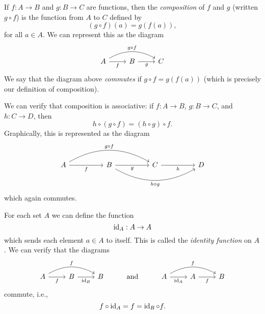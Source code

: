 \begin{sectionthm}
    If \(f: A \to B\) and \(g: B \to C\) are functions, then the \emph{composition} of \(f\) and \(g\) (written \(g \circ f\)) is the function from \(A\) to \(C\) defined by
    \[
        (g \circ f)(a) = g(f(a)),
    \]
    for all \(a \in A\). We can represent this as the diagram
    \[
        \begin{tikzcd}
            A \arrow[r, "f"'] \arrow[rr, "g \circ f", bend left] & B \arrow[r, "g"'] & C
        \end{tikzcd}
    \]
    We say that the diagram above \emph{commutes} if \(g \circ f = g(f(a))\) (which is precisely our definition of composition).

    We can verify that composition is associative: if \(f: A \to B\), \(g: B \to C\), and \(h: C \to D\), then
    \[
        h \circ (g \circ f) = (h \circ g) \circ f.
    \]
    Graphically, this is represented as the diagram
    \[
        \begin{tikzcd}
            A \arrow[rr, "f"'] \arrow[rrrr, "g \circ f", bend left] &  & B \arrow[rr, "g"'] \arrow[swap, rrrr, "h \circ g", bend right] &  & C \arrow[rr, "h"'] &  & D
        \end{tikzcd}
    \]
    which again commutes.
\end{sectionthm}

\begin{sectionthm}
    For each set \(A\) we can define the function
    \[
        \operatorname{id}_A: A \to A
    \]
    which sends each element \(a \in A\) to itself. This is called the \emph{identity function} on \(A\). We can verify that the diagrams
    \[
        \begin{tikzcd}
            A \arrow[r, "f"'] \arrow[rr, "f", bend left] & B \arrow[r, "\id_B"'] & B & \text{and}& A \arrow[r, "\id_A"'] \arrow[rr, "f", bend left] & A \arrow[r, "f"'] & B
        \end{tikzcd}
    \]
    commute, i.e.,
    \[
        f \circ \operatorname{id}_A = f = \operatorname{id}_B \circ f.
    \]
\end{sectionthm}
